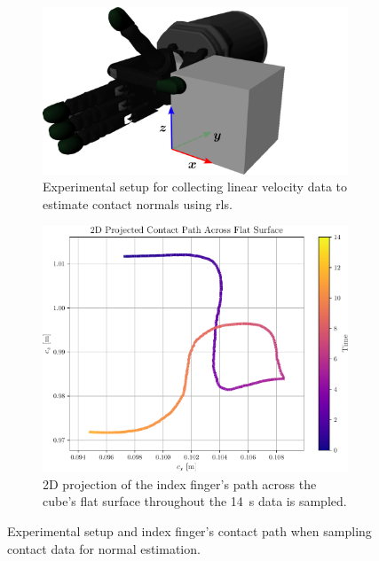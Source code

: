 \begin{figure}[h]
	\centering
	\begin{subfigure}[b]{0.48\textwidth}
		\centering
		\includegraphics[width=\textwidth]{chapters/1-tactile-perception/fig/inkscape/flat-contact-coor.pdf}
		\caption{Experimental setup for collecting linear velocity data to estimate contact normals using \gls{rls}.}
		\label{fig:flat-contact-coor}
	\end{subfigure}
	\hfill
	\begin{subfigure}[b]{0.48\textwidth}
		\centering
		\includegraphics[width=\textwidth]{chapters/1-tactile-perception/fig/matplotlib/2d-projected-contact-path-across-flat-surface.pdf}
		\caption{2D projection of the index finger's path across the cube's flat surface throughout the \SI{14}{\second} data is sampled.}
		\label{fig:2d-projected-contact-path-across-flat-surface}
	\end{subfigure}
		\caption{Experimental setup and index finger's contact path when sampling contact data for normal estimation.}
		\label{fig:experimental-setup-for-normal-estimation}
\end{figure}

